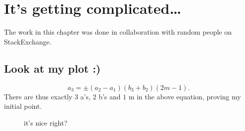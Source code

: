 
\Clear
\chapter{It's getting complicated\dots}
\label{cha:it_s_getting_complicated...}

The work in this chapter was done in collaboration with random people on StackExchange.

\section{Look at my plot :)}
\label{sec:look_at_my_plot_}

%
\begin{equation}
a_3 = \pm (a_2-a_1)(b_3+b_2)(2m-1).
\end{equation}
%
There are thus exactly $3$ a's, $2$ b's and $1$ m in the above equation, proving my initial point.

\begin{figure}[h]
	\centering
	\caption{it's nice right?}
	\label{fig:look_at_it}
\end{figure}

